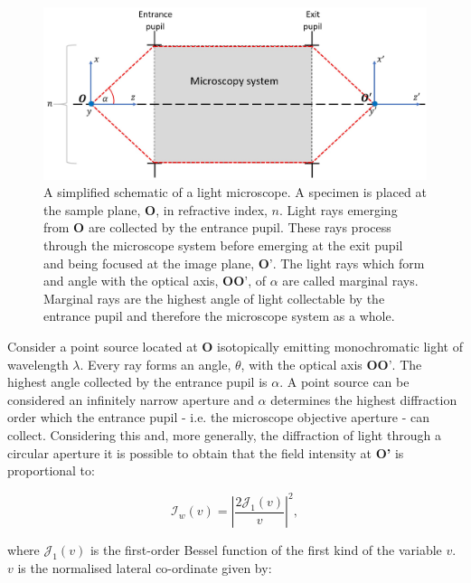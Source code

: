 \begin{figure}[h]
	\centering
	\includegraphics[width=\textwidth]{images/simplified_microscope_layout.jpg}
	\caption[A simplified schematic of a light microscope.]{A simplified 
		schematic of a light microscope. A specimen 
		is placed at the sample plane, $\textbf{O}$, in refractive index, $n$. Light 
		rays emerging from $\textbf{O}$ are collected by the entrance pupil. These 
		rays process through the microscope system before emerging at the exit pupil 
		and being focused at the image plane, $\textbf{O'}$. The light rays which 
		form and angle with the optical axis, $\textbf{OO'}$, of $\alpha$ are called
		marginal rays. Marginal rays are the highest angle of light  collectable by
		the entrance pupil and therefore the microscope system as a whole.}
	\label{fig:simplified_microscope_layout}
\end{figure}

Consider a point source located at $\textbf{O}$ isotopically emitting 
monochromatic light of wavelength $\lambda$. Every ray forms an angle, 
$\theta$, with the optical axis $\textbf{OO'}$. The highest angle collected
by the entrance pupil is $\alpha$. A point source can be considered an 
infinitely narrow aperture and $\alpha$ determines the highest 
diffraction order which the entrance pupil - i.e. the microscope
objective aperture - can collect\cite{davidson2002optical}. Considering this 
and, more generally, the diffraction of light through a circular aperture 
it is possible to obtain that the field intensity at \textbf{O'} is 
proportional to\cite{goodman2005introduction,born2013principles}:

\begin{equation}\label{eq:image_field_insentity}
\mathcal{I}_{w}(v) = \left|\frac{2\mathcal{J}_{1}(v)}{v}\right|^2,
\end{equation}

where $\mathcal{J}_{1}(v)$ is the first-order Bessel function of the first 
kind of the variable $v$\cite{watson1995treatise}. $v$ is the normalised 
lateral co-ordinate given by\cite{wilson1984theory}:

